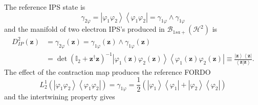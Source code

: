 \documentclass[aps,preprint]{revtex4}%
\begin{document}
The reference IPS state is
\begin{equation}
\gamma_{2\varphi}=\left\vert \varphi_{1}\varphi_{2}\right\rangle \left\langle
\varphi_{1}\varphi_{2}\right\vert =\gamma_{1\varphi}\wedge\gamma_{1\varphi}%
\end{equation}
and the manifold of two electron IPS's produced in $\mathcal{B}_{1sa+}\left(
\mathcal{H}^{2}\right)  $ is
\begin{align}
D_{IP}^{2}\left(  \mathbf{z}\right)   &  =\gamma_{2\varphi}\left(
\mathbf{z}\right)  =\gamma_{1\varphi}\left(  \mathbf{z}\right)  \wedge
\gamma_{1\varphi}\left(  \mathbf{z}\right) \\
&  =\det\left(  \mathbb{I}_{2}+\mathbf{z}^{\dagger}\mathbf{z}\right)
^{-1}\left\vert \varphi_{1}\left(  \mathbf{z}\right)  \varphi_{2}\left(
\mathbf{z}\right)  \right\rangle \left\langle \varphi_{1}\left(
\mathbf{z}\right)  \varphi_{2}\left(  \mathbf{z}\right)  \right\vert
\equiv\frac{\left\vert \mathbf{z}\right\rangle \left\langle \mathbf{z}%
\right\vert }{\left\langle \mathbf{z}\left\vert \mathbf{z}\right.
\right\rangle }.
\end{align}
The effect of the contraction map produces the reference FORDO\
\begin{equation}
L_{2}^{1}\left(  \left\vert \varphi_{1}\varphi_{2}\right\rangle \left\langle
\varphi_{1}\varphi_{2}\right\vert \right)  =\gamma_{1\varphi}=\frac{1}%
{2}\left(  \left\vert \varphi_{1}\right\rangle \left\langle \varphi
_{1}\right\vert +\left\vert \varphi_{2}\right\rangle \left\langle \varphi
_{2}\right\vert \right)
\end{equation}
and the intertwining property gives
\end{document}
